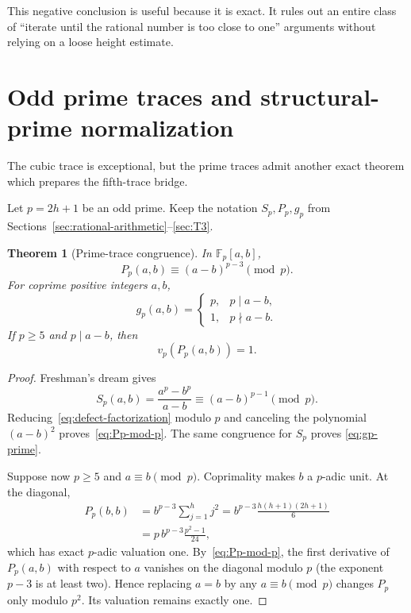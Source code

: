 \documentclass[11pt,oneside]{article}
\newtheorem{theorem}{Theorem}[section]
\theoremstyle{definition}
\theoremstyle{remark}
\begin{document}
This negative conclusion is useful because it is exact.  It rules out an entire class of
``iterate until the rational number is too close to one'' arguments without relying on a
loose height estimate.

\section{Odd prime traces and structural-prime normalization}
\label{sec:prime-traces}

The cubic trace is exceptional, but the prime traces admit another exact theorem which
prepares the fifth-trace bridge.

Let \(p=2h+1\) be an odd prime.  Keep the notation \(S_p,P_p,g_p\) from
Sections~\ref{sec:rational-arithmetic}--\ref{sec:T3}.

\begin{theorem}[Prime-trace congruence]
\label{thm:prime-trace-congruence}
In \(\mathbb F_p[a,b]\),
\begin{equation}
 \boxed{P_p(a,b)\equiv(a-b)^{p-3}\pmod p.}
 \label{eq:Pp-mod-p}
\end{equation}
For coprime positive integers \(a,b\),
\begin{equation}
 g_p(a,b)=
 \begin{cases}
 p,&p\mid a-b,\\
 1,&p\nmid a-b.
 \end{cases}
 \label{eq:gp-prime}
\end{equation}
If \(p\ge5\) and \(p\mid a-b\), then
\begin{equation}
 v_p(P_p(a,b))=1.
 \label{eq:Pp-exact-valuation}
\end{equation}
\end{theorem}

\begin{proof}
Freshman's dream gives
\[
 S_p(a,b)=\frac{a^p-b^p}{a-b}\equiv(a-b)^{p-1}\pmod p.
\]
Reducing~\eqref{eq:defect-factorization} modulo \(p\) and canceling the polynomial
\((a-b)^2\) proves~\eqref{eq:Pp-mod-p}.  The same congruence for \(S_p\) proves
\eqref{eq:gp-prime}.

Suppose now \(p\ge5\) and \(a\equiv b\pmod p\).  Coprimality makes \(b\) a \(p\)-adic
unit.  At the diagonal,
\begin{align*}
 P_p(b,b)
 &=b^{p-3}\sum_{j=1}^{h}j^2
 =b^{p-3}\frac{h(h+1)(2h+1)}6\\
 &=p\,b^{p-3}\frac{p^2-1}{24},
\end{align*}
which has exact \(p\)-adic valuation one.  By~\eqref{eq:Pp-mod-p}, the first derivative of
\(P_p(a,b)\) with respect to \(a\) vanishes on the diagonal modulo \(p\) (the exponent
\(p-3\) is at least two).  Hence replacing \(a=b\) by any \(a\equiv b\pmod p\) changes
\(P_p\) only modulo \(p^2\).  Its valuation remains exactly one.
\end{proof}
\end{document}
